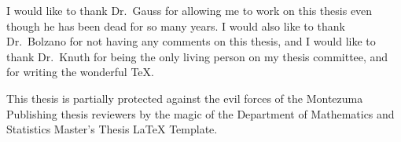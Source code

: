 \documentclass{sdsu-thesis}
\theoremstyle{dtm}
\begin{document}
\listoffigures


\begin{glossarypage}
  \glsaddall\printglossary[title=]
\end{glossarypage}


\begin{acknowledgments}
  I would like to thank Dr.~Gauss for allowing me to work on this
  thesis even though he has been dead for so many years.  I would also
  like to thank Dr.~Bolzano for not having any comments on this thesis,
  and I would like to thank Dr.~Knuth for being the only living person
  on my thesis committee, and for writing the wonderful \TeX.

  This thesis is partially protected against the evil forces of the
  Montezuma Publishing thesis reviewers by the magic of the Department
  of Mathematics and Statistics Master's Thesis \LaTeX{} Template.
\end{acknowledgments}

%
%


% 
% 


% 
% 
%
\nocite{*}




\end{document}
